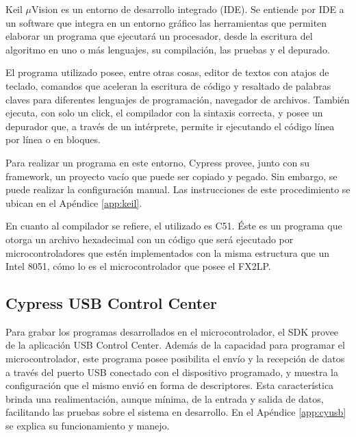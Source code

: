 	Keil $\mu$Vision es un entorno de desarrollo integrado (IDE). Se entiende por IDE a un software que integra en un entorno gráfico las herramientas que permiten elaborar un programa que ejecutará un procesador, desde la escritura del algoritmo en uno o más lenguajes, su compilación, las pruebas y el depurado.%
	
	El programa utilizado posee, entre otras cosas, editor de textos con atajos de teclado, comandos que aceleran la escritura de código y resaltado de palabras claves para diferentes lenguajes de programación, navegador de archivos. También ejecuta, con solo un click, el compilador con la sintaxis correcta, y posee un depurador que, a través de un intérprete, permite ir ejecutando el código línea por línea o en bloques.%
	
	Para realizar un programa en este entorno, Cypress provee, junto con su framework, un proyecto vacío que puede ser copiado y pegado. Sin embargo, se puede realizar la configuración manual. Las instrucciones de este procedimiento se ubican en el Apéndice \ref{app:keil}.%
	
	En cuanto al compilador se refiere, el utilizado es C51. Éste es un programa que otorga un archivo hexadecimal con un código que será ejecutado por microcontroladores que estén implementados con la misma estructura que un Intel 8051, cómo lo es el microcontrolador que posee el FX2LP.
	
	\subsection{Cypress USB Control Center}
	Para grabar los programas desarrollados en el microcontrolador, el SDK provee de la aplicación USB Control Center.
	Además de la capacidad para programar el microcontrolador, este programa posee posibilita el envío y la recepción de datos a través del puerto USB conectado con el dispositivo programado, y muestra la configuración que el mismo envió en forma de descriptores. Esta característica brinda una realimentación, aunque mínima, de la entrada y salida de datos, facilitando las pruebas sobre el sistema en desarrollo. %
	En el Apéndice \ref{app:cyusb} se explica su funcionamiento y manejo.
	